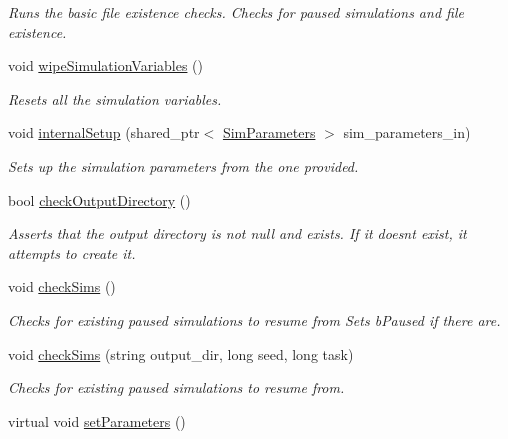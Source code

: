 \begin{DoxyCompactItemize}
\begin{DoxyCompactList}\small\item\em Runs the basic file existence checks. Checks for paused simulations and file existence. \end{DoxyCompactList}\item 
void \hyperlink{class_tree_aa31508ea6d5801c6dee17c035f393b60}{wipe\+Simulation\+Variables} ()\hypertarget{class_tree_aa31508ea6d5801c6dee17c035f393b60}{}\label{class_tree_aa31508ea6d5801c6dee17c035f393b60}

\begin{DoxyCompactList}\small\item\em Resets all the simulation variables. \end{DoxyCompactList}\item 
void \hyperlink{class_tree_a9bbc17547248e676085fab58ab2022e7}{internal\+Setup} (shared\+\_\+ptr$<$ \hyperlink{struct_sim_parameters}{Sim\+Parameters} $>$ sim\+\_\+parameters\+\_\+in)
\begin{DoxyCompactList}\small\item\em Sets up the simulation parameters from the one provided. \end{DoxyCompactList}\item 
bool \hyperlink{class_tree_a5c6065ede9862e9fb6561eb8beaf5d78}{check\+Output\+Directory} ()
\begin{DoxyCompactList}\small\item\em Asserts that the output directory is not null and exists. If it doesn\textquotesingle{}t exist, it attempts to create it. \end{DoxyCompactList}\item 
void \hyperlink{class_tree_ad0bcc474a9ab1d4e3e2458c4de7304ad}{check\+Sims} ()
\begin{DoxyCompactList}\small\item\em Checks for existing paused simulations to resume from Sets b\+Paused if there are. \end{DoxyCompactList}\item 
void \hyperlink{class_tree_aafaede1da6c79583bf2e28b7a1881a5c}{check\+Sims} (string output\+\_\+dir, long seed, long task)
\begin{DoxyCompactList}\small\item\em Checks for existing paused simulations to resume from. \end{DoxyCompactList}\item 
virtual void \hyperlink{class_tree_ac374d237b7e2e7e11f6a0ff395003635}{set\+Parameters} ()\hypertarget{class_tree_ac374d237b7e2e7e11f6a0ff395003635}{}\label{class_tree_ac374d237b7e2e7e11f6a0ff395003635}


\end{DoxyCompactItemize}
